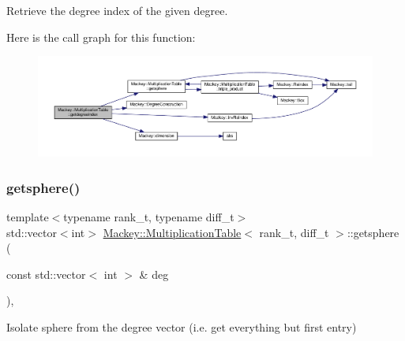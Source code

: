 Retrieve the degree index of the given degree. 

Here is the call graph for this function\+:\nopagebreak
\begin{figure}[H]
\begin{center}
\leavevmode
\includegraphics[width=350pt]{classMackey_1_1MultiplicationTable_ac15f13c4a9d160226582e1970ef4b00c_cgraph}
\end{center}
\end{figure}
\mbox{\label{classMackey_1_1MultiplicationTable_ad4245f4a8122f0661f969498ef53f999}} 
\subsubsection{\texorpdfstring{getsphere()}{getsphere()}}
{\footnotesize\ttfamily template$<$typename rank\+\_\+t, typename diff\+\_\+t$>$ \\
std\+::vector$<$int$>$ \hyperlink{classMackey_1_1MultiplicationTable}{Mackey\+::\+Multiplication\+Table}$<$ rank\+\_\+t, diff\+\_\+t $>$\+::getsphere (\begin{DoxyParamCaption}\item[{const std\+::vector$<$ int $>$ \&}]{deg }\end{DoxyParamCaption})\hspace{0.3cm}{\ttfamily [inline]}, {\ttfamily [protected]}}



Isolate sphere from the degree vector (i.\+e. get everything but first entry) 

